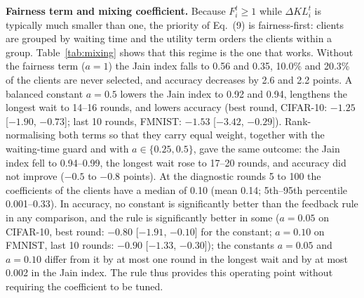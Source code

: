 \documentclass[pdflatex,sn-mathphys-num,oneside]{sn-jnl}%
\theoremstyle{thmstyleone}%
\theoremstyle{thmstyletwo}%
\theoremstyle{thmstylethree}%
\begin{document}
\textbf{Fairness term and mixing coefficient.} Because $F_i^t\ge 1$ while $\Delta KL_i^t$ is typically much smaller than one, the priority of Eq.~(9) is fairness-first: clients are grouped by waiting time and the utility term orders the clients within a group. Table~\ref{tab:mixing} shows that this regime is the one that works. Without the fairness term ($a=1$) the Jain index falls to 0.56 and 0.35, 10.0\% and 20.3\% of the clients are never selected, and accuracy decreases by 2.6 and 2.2 points. A balanced constant $a=0.5$ lowers the Jain index to 0.92 and 0.94, lengthens the longest wait to 14--16 rounds, and lowers accuracy (best round, CIFAR-10: $-1.25$ [$-1.90$, $-0.73$]; last 10 rounds, FMNIST: $-1.53$ [$-3.42$, $-0.29$]). Rank-normalising both terms so that they carry equal weight, together with the waiting-time guard and with $a\in\{0.25,0.5\}$, gave the same outcome: the Jain index fell to 0.94--0.99, the longest wait rose to 17--20 rounds, and accuracy did not improve ($-0.5$ to $-0.8$ points). At the diagnostic rounds 5 to 100 the coefficients of the clients have a median of 0.10 (mean 0.14; 5th--95th percentile 0.001--0.33). In accuracy, no constant is significantly better than the feedback rule in any comparison, and the rule is significantly better in some ($a=0.05$ on CIFAR-10, best round: $-0.80$ [$-1.91$, $-0.10$] for the constant; $a=0.10$ on FMNIST, last 10 rounds: $-0.90$ [$-1.33$, $-0.30$]); the constants $a=0.05$ and $a=0.10$ differ from it by at most one round in the longest wait and by at most 0.002 in the Jain index. The rule thus provides this operating point without requiring the coefficient to be tuned.
\end{document}
